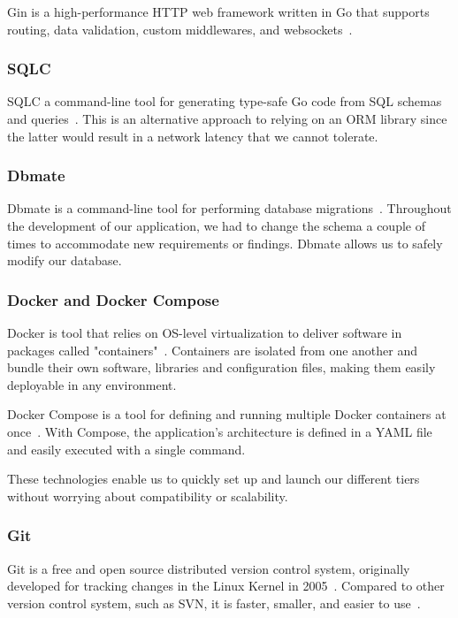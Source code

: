 Gin is a high-performance HTTP web framework written in Go that supports routing, data validation, custom middlewares, and websockets~\autocite{noauthor_gin-gonic/gin_2021}.

\subsubsection{SQLC}

SQLC a command-line tool for generating type-safe Go code from SQL schemas and queries~\autocite{conroy_kyleconroy/sqlc_2021}.
This is an alternative approach to relying on an ORM library since the latter would result in a network latency that we cannot tolerate.

\subsubsection{Dbmate}

Dbmate is a command-line tool for performing database migrations~\autocite{macneil_amacneil/dbmate_2021}.
Throughout the development of our application, we had to change the schema a couple of times to accommodate new requirements or findings.
Dbmate allows us to safely modify our database.

\subsubsection{Docker and Docker Compose}

Docker is tool that relies on OS-level virtualization to deliver software in packages called "containers"~\autocite{noauthor_container_nodate}. Containers are isolated from one another and bundle their own software, libraries and configuration files, making them easily deployable in any environment.

Docker Compose is a tool for defining and running multiple Docker containers at once~\autocite{noauthor_overview_2021}. With Compose, the application's architecture is defined in a YAML file and easily executed with a single command.

These technologies enable us to quickly set up and launch our different tiers without worrying about compatibility or scalability.

\subsubsection{Git}

Git is a free and open source distributed version control system, originally developed for tracking changes in the Linux Kernel in 2005~\autocite{noauthor_git_nodate}.
Compared to other version control system, such as SVN, it is faster, smaller, and easier to use~\autocite{noauthor_about_nodate}.

